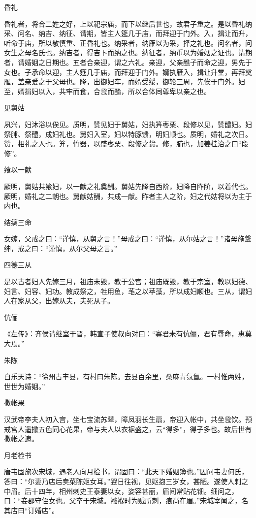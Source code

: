 \documentclass[a4paper,12pt,UTF8,twoside]{ctexbook}
\begin{document}
    昏礼
    
    昏礼者，将合二姓之好，上以祀宗庙，而下以继后世也，故君子重之。是以昏礼纳采、问名、纳吉、纳征、请期，皆主人筵几于庙，而拜迎于门外。入，揖让而升，听命于庙，所以敬慎重、正昏礼也。纳采者，纳雁以为采，择之礼也。问名者，问女生之母名氏也。纳吉者，得吉卜而纳之也。纳征者，纳币以为婚姻之证也。请期者，请婚姻之日期也。五者合亲迎，谓之六礼。亲迎，父亲醮子而命之迎，男先于女也。子承命以迎，主人筵几于庙，而拜迎于门外。婿执雁入，揖让升堂，再拜奠雁，盖亲爱之于父母也。降，出御妇车，而婿受绥，御轮三周，先俟于门外。妇至，婿揖妇以入，共牢而食，合卺而酳，所以合体同尊卑以亲之也。
    
    见舅姑
    
    夙兴，妇沐浴以俟见。质明，赞见妇于舅姑，妇执笲枣栗、段修以见，赞醴妇。妇祭脯、祭醴，成妇礼也。舅妇入室，妇以特豚馈，明妇顺也。质明，婚礼之次日。赞，相礼之人也。笲，竹器，以盛枣栗、段修之贽。修，脯也，加姜桂治之曰“段修”。
    
    飨以一献
    
    厥明，舅姑共飨妇，以一献之礼奠酬。舅姑先降自西阶，妇降自阼阶，以着代也。厥明，婚礼之二朝也。舅献姑酬，共成一献。阼者主人之阶，妇之代姑将以为主于内也。
    
    结缡三命
    
    女嫁，父戒之曰：“谨慎，从舅之言！”母戒之曰：“谨慎，从尔姑之言！”诸母施鞶绅，戒之曰：“谨慎，从尔父母之言。”
    
    四德三从
    
    是以古者妇人先嫁三月，祖庙未毁，教于公宫；祖庙既毁，教于宗室，教以妇德、妇言、妇容、妇功。教成祭之，牲用鱼，芼之以苹藻，所以成妇顺也。三从，谓妇人在家从父，出嫁从夫，夫死从子。
    
    伉俪
    
    《左传》：齐侯请继室于晋，韩宣子使叔向对曰：“寡君未有伉俪，君有辱命，惠莫大焉。”
    
    朱陈
    
    白乐天诗：“徐州古丰县，有村曰朱陈。去县百余里，桑麻青氛氲。一村惟两姓，世世为婚姻。”
    
    撒帐果
    
    汉武帝李夫人初入宫，坐七宝流苏辇，障凤羽长生扇，帝迎入帐中，共坐卺饮。预戒宫人遥撒五色同心花果，帝与夫人以衣裾盛之，云“得多”，得子多也。故后世有撒帐之遗。
    
    月老检书
    
    唐韦固旅次宋城，遇老人向月检书，谓固曰：“此天下婚姻簿也。”因问韦妻何氏，答曰：“尔妻乃店后卖菜陈妪女耳。”翌日往视，见妪抱三岁女，甚陋。遂使人刺之中眉。后十四年，相州刺史王泰妻以女，姿容甚丽，眉间常贴花钿。细问之，曰：“妾郡守侄女也。父卒于宋城。襁褓时为贼所刺，痕尚在眉。”宋城宰闻之，名其店曰“订婚店”。
    
\end{document}
